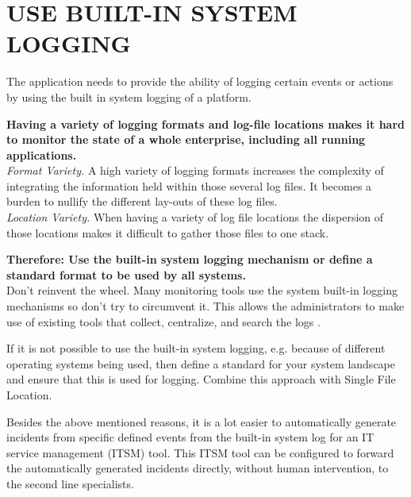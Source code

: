 \newpage
\section*{USE BUILT-IN SYSTEM LOGGING}

The application needs to provide the ability of logging certain events or actions by using the built in system logging of a platform. 

\begin{center}
  
\end{center}

\textbf{Having a variety of logging formats and log-file locations makes it hard to monitor the state of a whole enterprise, including all running applications.}\\

\textit{Format Variety.} A high variety of logging formats increases the complexity of integrating the information held within those several log files. It becomes a burden to nullify the different lay-outs of these log files.\\ 

\textit{Location Variety.} When having a variety of log file locations the dispersion of those locations makes it difficult to gather those files to one stack.

\begin{center}
   
\end{center}

\textbf{Therefore: Use the built-in system logging mechanism or define a standard format to be used by all systems.}\\

Don't reinvent the wheel. Many monitoring tools use the system built-in logging mechanisms so don't try to circumvent it. This allows the administrators to make use of existing tools that collect, centralize, and search the logs \cite{Limoncelli2011a}.

If it is not possible to use the built-in system logging, e.g. because of different operating systems being used, then define a standard for your system landscape and ensure that this is used for logging. Combine this approach with {\sc Single File Location}.

\begin{center}
   
\end{center}

Besides the above mentioned reasons, it is a lot easier to automatically generate incidents from specific defined events from the built-in system log for an IT service management (ITSM) tool. This ITSM tool can be configured to forward the automatically generated incidents directly, without human intervention, to the second line specialists.